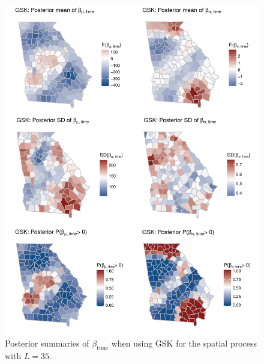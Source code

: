 \documentclass[11pt]{article}
\begin{document}
\begin{figure}  %
  \centering
  \includegraphics[width=\linewidth]{plots/gsk-post-betatime.pdf}
  \caption{Posterior summaries of $\beta_{\text{time}}$ when using GSK for the spatial process with $L = 35$.}
  \label{ebfig:gskpost}
\end{figure}
\end{document}

